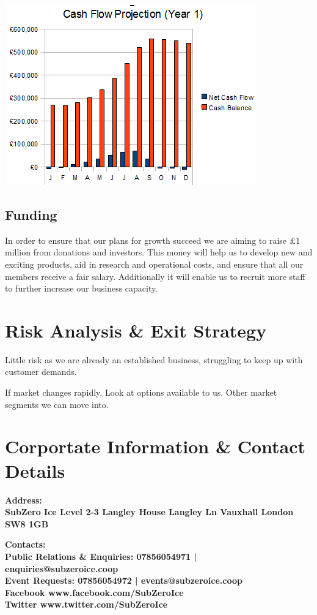 \documentclass{article}
\begin{document}
\includegraphics[scale=1.0]{cashFlowYear1.png}

\subsection{Funding}

In order to ensure that our plans for growth succeed we are aiming to raise £1 million from donations and investors. This money will help us to develop new and exciting products, aid in research and operational costs, and ensure that all our members receive a fair salary. Additionally it will enable us to recruit more staff to further increase our business capacity.

\section{Risk Analysis \& Exit Strategy}


Little risk as we are already an established business, struggling to keep up with customer demands.

If market changes rapidly. Look at options available to us. Other market segments we can move into.



\section{Corportate Information \& Contact Details}

\bf{Address:} \\

SubZero Ice
Level 2-3 
Langley House
Langley Ln
Vauxhall
London
SW8 1GB

\bf{Contacts:} \\

Public Relations \& Enquiries: 07856054971 | enquiries@subzeroice.coop \\

Event Requests: 07856054972 | events@subzeroice.coop \\

Facebook www.facebook.com/SubZeroIce \\
Twitter www.twitter.com/SubZeroIce
\end{document}
